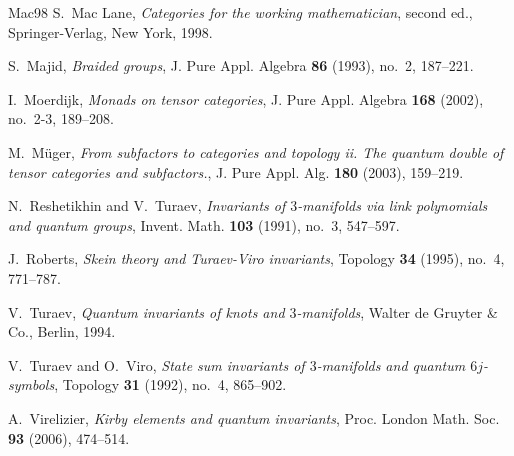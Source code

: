 \documentclass[a4paper]{amsart}
\theoremstyle{definition}
\begin{document}
\begin{thebibliography}{{Mac}98}
S.~{Mac Lane}, \emph{Categories for the working mathematician}, second ed.,
  Springer-Verlag, New York, 1998.

S.~Majid, \emph{Braided groups}, J. Pure Appl. Algebra \textbf{86} (1993),
  no.~2, 187--221.

I.~Moerdijk, \emph{Monads on tensor categories}, J. Pure Appl. Algebra
  \textbf{168} (2002), no.~2-3, 189--208.

M.~M\"{u}ger, \emph{From subfactors to categories and topology ii. {T}he
  quantum double of tensor categories and subfactors.}, J. Pure Appl. Alg.
  \textbf{180} (2003), 159--219.

N.~Reshetikhin and V.~Turaev, \emph{Invariants of $3$-manifolds via link
  polynomials and quantum groups}, Invent. Math. \textbf{103} (1991), no.~3,
  547--597.

J.~Roberts, \emph{Skein theory and {T}uraev-{V}iro invariants}, Topology \textbf{34} (1995), no.~4, 771--787.

V.~Turaev, \emph{Quantum invariants of knots and $3$-manifolds}, Walter de
  Gruyter \& Co., Berlin, 1994.

V.~Turaev and O.~Viro, \emph{State sum invariants of {$3$}-manifolds and
  quantum {$6j$}-symbols}, Topology \textbf{31} (1992), no.~4, 865--902.

A.~Virelizier, \emph{Kirby elements and quantum invariants}, Proc. London Math.
  Soc. \textbf{93} (2006), 474--514.
\end{thebibliography}
\end{document}
